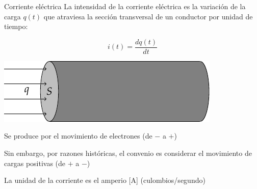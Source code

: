 \documentclass[aspectratio=169, xcolor={usenames,svgnames,dvipsnames}]{beamer}
\begin{document}
\begin{frame}{Corriente eléctrica}
    La \alert{intensidad de la corriente eléctrica} es la variación de la carga \(q(t)\) que atraviesa la sección transversal de un conductor por unidad de tiempo:
    \vspace{7mm}
    
    \begin{minipage}[c]{0.48\linewidth}
    \begin{equation*}
      i(t)=\frac{dq(t)}{dt}
    \end{equation*}
    \end{minipage}
    \hfill
    \begin{minipage}[c]{0.48\linewidth}
    \begin{center}
    \includegraphics[width=0.8\linewidth]{../figs/seccion_conductor.pdf}
    \end{center}
    \end{minipage}
    
    \vspace{7mm}
    Se produce por el \alert{movimiento de electrones} (de $-$ a $+$)
    
    Sin embargo, por razones históricas, el convenio es considerar el \alert{movimiento de cargas positivas} (de $+$ a $-$)
    
    \vspace{3mm}
    La \alert{unidad} de la corriente es el \alert{amperio} [A] (culombios/segundo)

\end{frame}

\end{document}
